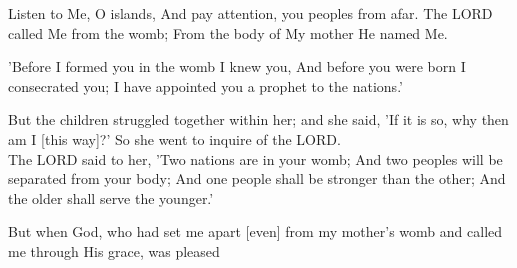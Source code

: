 \begin{scripture}[Isaiah 49:1]
    Listen to Me, O islands, And pay attention, you peoples from afar. The LORD called Me from the womb; From the body of My mother He named Me.
\end{scripture}

\vspace{4\baselineskip}

\begin{scripture}[Jeremiah 1:5]
    'Before I formed you in the womb I knew you, And before you were born I consecrated you; I have appointed you a prophet to the nations.'
\end{scripture}

\vspace{4\baselineskip}

\begin{scripture}[Genesis 25:22-23]
    But the children struggled together within her; and she said, 'If it is so, why then am I [this way]?' So she went to inquire of the LORD.\\
    The LORD said to her, 'Two nations are in your womb; And two peoples will be separated from your body; And one people shall be stronger than the other; And the older shall serve the younger.'
\end{scripture}

\vspace{4\baselineskip}

\begin{scripture}[Galatians 1:15]
    But when God, who had set me apart [even] from my mother's womb and called me through His grace, was pleased
\end{scripture}

\vspace{4\baselineskip}


\vspace{10\baselineskip}
